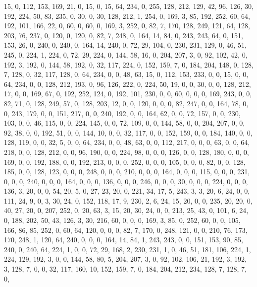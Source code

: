 \begin{DoxyCode}
       15, 0, 112, 153, 169, 21, 0, 15, 0, 15, 64, 234, 0, 255, 128, 212, 129, 42, 96, 126, 30, 192, 224, 50, 83,
       235, 0, 30, 0, 30, 128, 212, 1, 254, 0, 169, 3, 85, 192, 252, 60, 64, 192, 101, 166, 22, 0, 60, 0, 60, 0, 169,
       3, 252, 0, 82, 7, 170, 128, 249, 121, 64, 128, 203, 76, 237, 0, 120, 0, 120, 0, 82, 7, 248, 0, 164, 14, 84,
       0, 243, 243, 64, 0, 151, 153, 26, 0, 240, 0, 240, 0, 164, 14, 240, 0, 72, 29, 104, 0, 230, 231, 129, 0, 46,
       51, 245, 0, 224, 1, 224, 0, 72, 29, 224, 0, 144, 58, 16, 0, 204, 207, 3, 0, 92, 102, 42, 0, 192, 3, 192, 0,
       144, 58, 192, 0, 32, 117, 224, 0, 152, 159, 7, 0, 184, 204, 148, 0, 128, 7, 128, 0, 32, 117, 128, 0, 64,
       234, 0, 0, 48, 63, 15, 0, 112, 153, 233, 0, 0, 15, 0, 0, 64, 234, 0, 0, 128, 212, 193, 0, 96, 126, 222, 0, 224,
       50, 19, 0, 0, 30, 0, 0, 128, 212, 17, 0, 0, 169, 67, 0, 192, 252, 124, 0, 192, 101, 230, 0, 0, 60, 0, 0, 0,
       169, 243, 0, 0, 82, 71, 0, 128, 249, 57, 0, 128, 203, 12, 0, 0, 120, 0, 0, 0, 82, 247, 0, 0, 164, 78, 0, 0,
       243, 179, 0, 0, 151, 217, 0, 0, 240, 192, 0, 0, 164, 62, 0, 0, 72, 157, 0, 0, 230, 103, 0, 0, 46, 115, 0,
       0, 224, 145, 0, 0, 72, 109, 0, 0, 144, 58, 0, 0, 204, 207, 0, 0, 92, 38, 0, 0, 192, 51, 0, 0, 144, 10, 0, 0,
       32, 117, 0, 0, 152, 159, 0, 0, 184, 140, 0, 0, 128, 119, 0, 0, 32, 5, 0, 0, 64, 234, 0, 0, 48, 63, 0, 0,
       112, 217, 0, 0, 0, 63, 0, 0, 64, 218, 0, 0, 128, 212, 0, 0, 96, 190, 0, 0, 224, 98, 0, 0, 0, 126, 0, 0, 128,
       180, 0, 0, 0, 169, 0, 0, 192, 188, 0, 0, 192, 213, 0, 0, 0, 252, 0, 0, 0, 105, 0, 0, 0, 82, 0, 0, 128, 185, 0,
       0, 128, 123, 0, 0, 0, 248, 0, 0, 0, 210, 0, 0, 0, 164, 0, 0, 0, 115, 0, 0, 0, 231, 0, 0, 0, 240, 0, 0, 0,
       164, 0, 0, 0, 136, 0, 0, 0, 246, 0, 0, 0, 30, 0, 0, 0, 224, 0, 0, 0, 136, 3, 20, 0, 0, 54, 20, 5, 0, 27, 23,
       20, 0, 221, 34, 17, 5, 243, 3, 3, 20, 6, 24, 0, 0, 111, 24, 9, 0, 3, 30, 24, 0, 152, 118, 17, 9, 230, 2, 6,
       24, 15, 20, 0, 0, 235, 20, 20, 0, 40, 27, 20, 0, 207, 252, 0, 20, 63, 3, 15, 20, 30, 24, 0, 0, 213, 25, 43,
       0, 101, 6, 24, 0, 188, 202, 50, 43, 126, 3, 30, 216, 60, 0, 0, 0, 169, 3, 85, 0, 252, 60, 0, 0, 105, 166,
       86, 85, 252, 0, 60, 64, 120, 0, 0, 0, 82, 7, 170, 0, 248, 121, 0, 0, 210, 76, 173, 170, 248, 1, 120, 64, 240,
       0, 0, 0, 164, 14, 84, 1, 243, 243, 0, 0, 151, 153, 90, 85, 240, 0, 240, 64, 224, 1, 0, 0, 72, 29, 168, 2,
       230, 231, 1, 0, 46, 51, 181, 106, 224, 1, 224, 129, 192, 3, 0, 0, 144, 58, 80, 5, 204, 207, 3, 0, 92, 102,
       106, 21, 192, 3, 192, 3, 128, 7, 0, 0, 32, 117, 160, 10, 152, 159, 7, 0, 184, 204, 212, 234, 128, 7, 128, 7, 0,

\end{DoxyCode}
